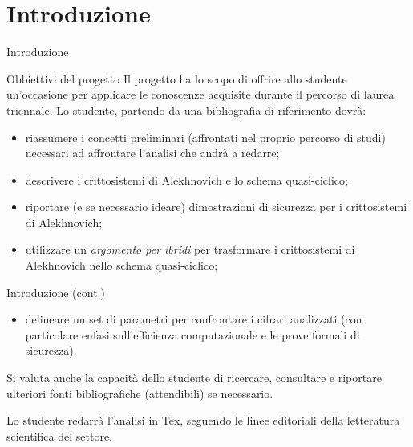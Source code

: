 \documentclass[10pt]{beamer}
\begin{document}
	\section{Introduzione}
		\begin{frame}{Introduzione}
			\begin{block}{Obbiettivi del progetto}
				Il progetto ha lo scopo di offrire allo studente un'occasione per applicare le conoscenze acquisite durante il percorso di laurea triennale. Lo studente, partendo da una bibliografia di riferimento dovrà:
				\begin{itemize}
					\item riassumere i concetti preliminari (affrontati nel proprio percorso di studi) necessari ad affrontare l'analisi che andrà a redarre;
					\item descrivere i crittosistemi di Alekhnovich e lo schema quasi-ciclico;
					\item riportare (e se necessario ideare) dimostrazioni di sicurezza per i crittosistemi di Alekhnovich;
					\item utilizzare un \emph{argomento per ibridi} per trasformare i crittosistemi di Alekhnovich nello schema quasi-ciclico;
				\end{itemize}
			\end{block}
		\end{frame}
		\begin{frame}{Introduzione (cont.)}
			\begin{block}{}
				\begin{itemize}
					\item delineare un set di parametri per confrontare i cifrari analizzati (con particolare enfasi sull'efficienza computazionale e le prove formali di sicurezza).
				\end{itemize}
				Si valuta anche la capacità dello studente di ricercare, consultare e riportare ulteriori fonti bibliografiche (attendibili) se necessario.
				
				Lo studente redarrà l'analisi in Tex, seguendo le linee editoriali della letteratura scientifica del settore.
			\end{block}
		\end{frame}
\end{document}
